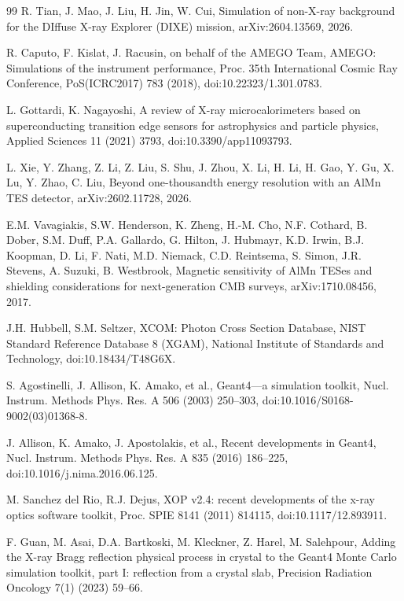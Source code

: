 \documentclass[11pt]{article}
\begin{document}
\begin{thebibliography}{99}
R. Tian, J. Mao, J. Liu, H. Jin, W. Cui, Simulation of non-X-ray background for the DIffuse X-ray Explorer (DIXE) mission, arXiv:2604.13569, 2026.

R. Caputo, F. Kislat, J. Racusin, on behalf of the AMEGO Team, AMEGO: Simulations of the instrument performance, Proc. 35th International Cosmic Ray Conference, PoS(ICRC2017) 783 (2018), doi:10.22323/1.301.0783.

L. Gottardi, K. Nagayoshi, A review of X-ray microcalorimeters based on superconducting transition edge sensors for astrophysics and particle physics, Applied Sciences 11 (2021) 3793, doi:10.3390/app11093793.

L. Xie, Y. Zhang, Z. Li, Z. Liu, S. Shu, J. Zhou, X. Li, H. Li, H. Gao, Y. Gu, X. Lu, Y. Zhao, C. Liu, Beyond one-thousandth energy resolution with an AlMn TES detector, arXiv:2602.11728, 2026.

E.M. Vavagiakis, S.W. Henderson, K. Zheng, H.-M. Cho, N.F. Cothard, B. Dober, S.M. Duff, P.A. Gallardo, G. Hilton, J. Hubmayr, K.D. Irwin, B.J. Koopman, D. Li, F. Nati, M.D. Niemack, C.D. Reintsema, S. Simon, J.R. Stevens, A. Suzuki, B. Westbrook, Magnetic sensitivity of AlMn TESes and shielding considerations for next-generation CMB surveys, arXiv:1710.08456, 2017.

J.H. Hubbell, S.M. Seltzer, XCOM: Photon Cross Section Database, NIST Standard Reference Database 8 (XGAM), National Institute of Standards and Technology, doi:10.18434/T48G6X.

S. Agostinelli, J. Allison, K. Amako, et al., Geant4---a simulation toolkit, Nucl. Instrum. Methods Phys. Res. A 506 (2003) 250--303, doi:10.1016/S0168-9002(03)01368-8.

J. Allison, K. Amako, J. Apostolakis, et al., Recent developments in Geant4, Nucl. Instrum. Methods Phys. Res. A 835 (2016) 186--225, doi:10.1016/j.nima.2016.06.125.

M. Sanchez del Rio, R.J. Dejus, XOP v2.4: recent developments of the x-ray optics software toolkit, Proc. SPIE 8141 (2011) 814115, doi:10.1117/12.893911.

F. Guan, M. Asai, D.A. Bartkoski, M. Kleckner, Z. Harel, M. Salehpour, Adding the X-ray Bragg reflection physical process in crystal to the Geant4 Monte Carlo simulation toolkit, part I: reflection from a crystal slab, Precision Radiation Oncology 7(1) (2023) 59--66.


\end{thebibliography}
\end{document}
